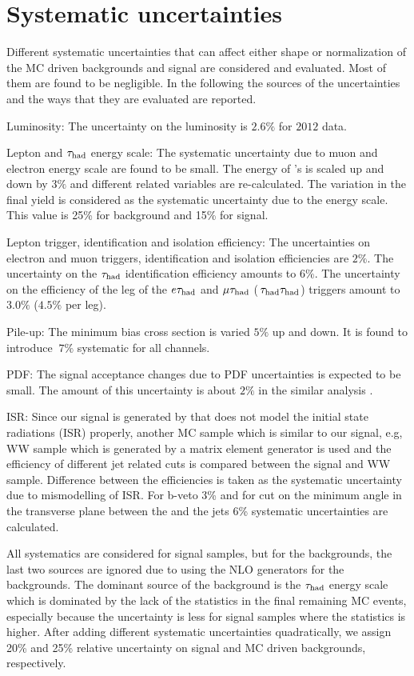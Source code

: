 \section{Systematic uncertainties}
\label{sect:sys}
Different systematic uncertainties that can affect either shape or normalization of the MC driven backgrounds
and signal are considered and evaluated.
Most of them are found to be negligible. In the following the sources of the uncertainties and the ways that they are evaluated are reported. 

 Luminosity: The uncertainty on the luminosity  is $2.6\%$ for $2012$ data.
 
 Lepton and $\tau_{\rm had}$ energy scale: The systematic uncertainty due to muon and electron energy scale are found to be small.
The energy of \hadtau's is scaled up and down by $3\%$ and different \Tau related variables are re-calculated.  The variation in the final yield is considered as the
systematic uncertainty due to the \Tau energy scale. This value is 25\% for background and 15\% for signal.

 Lepton trigger, identification and isolation efficiency: The uncertainties on electron and muon triggers, identification and isolation efficiencies are $2\%$. 
The uncertainty on the $\tau_{\rm had}$ identification efficiency amounts to $6\%$. 
The uncertainty on the efficiency of the \Tau leg of the $e\tau_{\rm had}$ and $\mu\tau_{\rm had}$ ($\,\tau_{\rm had}\tau_{\rm had}$) triggers amount to $3.0\%$ ($4.5\%$ per leg).

 Pile-up: The minimum bias cross section is varied $5 \%$ up and down. It is found to introduce $~7 \%$ systematic for all channels.    

 PDF: The signal acceptance changes due to PDF uncertainties is expected to be small. 
The amount of this uncertainty is about $2\%$ in the similar analysis \cite{Khachatryan:2014qwa}.

ISR: Since our signal is generated by \PYTHIA that does not  model the initial state radiations (ISR) properly, another MC sample which is similar to our signal, e.g, WW sample 
which is generated by a matrix element generator is used and the efficiency of different jet related cuts is compared between the signal and WW sample. Difference between the
efficiencies is taken as the systematic uncertainty due to mismodelling of ISR. For b-veto 3\% and for cut on   the minimum angle in the transverse plane between 
the \MET and the jets 6\% systematic uncertainties are  calculated.  

All systematics are considered for signal samples, but for the backgrounds, the last two sources are ignored due to using the NLO generators 
for the backgrounds. The dominant source of the background is the $\tau_{\rm had}$ energy scale which is dominated by the lack of the statistics in the 
final remaining MC events, especially because the uncertainty is less for signal samples where the statistics is higher. 
After adding different systematic uncertainties quadratically, 
we assign 20\% and 25\% relative uncertainty on signal and MC driven backgrounds, respectively.

